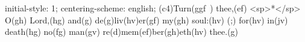 initial-style: 1;
centering-scheme: english;
(c4)Turn(ggf~) thee,(ef) <sp>*</sp> O(gh) Lord,(hg) and(g) de(g)liv(hv)er(gf) my(gh) soul:(hv) (;) for(hv) in(jv) death(hg) no(fg) man(gv) re(d)mem(ef)ber(gh)eth(hv) thee.(g)
